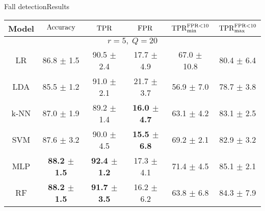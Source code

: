\begin{frame}{Fall detection}{Results}
\begin{table}[ht]
\small
\begin{center}
\begin{tabular}{c c c c c c}
\toprule
  Model     & $\mathrm{Accuracy}$ & $\mathrm{TPR}$ & $\mathrm{FPR}$ & $\mathrm{TPR}_{\text{min}}^{\mathrm{FPR}<10}$ & $\mathrm{TPR}_{\text{max}}^{\mathrm{FPR}<10}$ \\
\midrule
 \multicolumn{6}{c}{\footnotesize $r = 5,\; Q = 20$} \\
\hline
LR   &  86.8 $\pm$ 1.5 & 90.5  $\pm$  2.4 &  17.7  $\pm$  4.9 & 67.0  $\pm$  10.8 & 80.4 $\pm$  6.4 \\
LDA   &  85.5  $\pm$  1.2  & 91.0  $\pm$  2.1 &  21.7  $\pm$  3.7 & 56.9  $\pm$  7.0 & 78.7  $\pm$  3.8 \\
k-NN  &    87.0  $\pm$  1.9 & 89.2  $\pm$  1.4  & \textbf{16.0  $\pm$  4.7} & 63.1  $\pm$  4.2 & 83.1  $\pm$  2.5 \\
SVM  &   87.6  $\pm$  3.2 & 90.0  $\pm$  4.5 & \textbf{15.5  $\pm$  6.8} & 69.2 $\pm$ 2.1 & 82.9  $\pm$  3.2 \\
MLP  &\textbf{88.2  $\pm$  1.5} & \textbf{92.4  $\pm$  1.2} & 17.3  $\pm$  4.1 & 71.4  $\pm$  4.5 & 85.1  $\pm$  2.1\\
RF  & \textbf{88.2  $\pm$  1.5} & \textbf{91.7 $\pm$ 3.5} & 16.2  $\pm$  6.2 & 63.8  $\pm$  6.8 & 84.3  $\pm$  7.9 \\
\bottomrule
\end{tabular}
\end{center}
\end{table}

\cite{minvielle2017fall}

\end{frame}